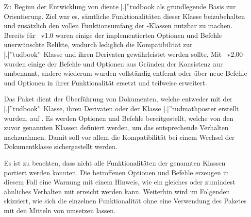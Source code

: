 \begin{DeclareEntity}{}
\begin{NoIndexDefault}
Zu Beginn der Entwicklung von \TUDScript diente \Class|.|''{tudbook} als 
grundlegende Basis zur Orientierung. Ziel war es, sämtliche Funktionalitäten 
dieser Klasse beizubehalten und zusätzlich den vollen Funktionsumfang der 
\KOMAScript-Klassen nutzbar zu machen. Bereits für \TUDScript~v1.0 waren einige 
der implementierten Optionen und Befehle unerwünschte Relikte, wodurch 
lediglich die Kompatibilität zur \Class|.|''{tudbook}"~Klasse und ihren 
Derivaten gewährleistet werden sollte. Mit \TUDScript~v2.00 wurden einige der 
Befehle und Optionen aus Gründen der Konsistenz nur umbenannt, andere wiederum 
wurden vollständig entfernt oder über neue Befehle und Optionen in ihrer 
Funktionalität ersetzt und teilweise erweitert. 

Das Paket  dient der Überführung von Dokumenten, welche
entweder mit der \Class|.|''{tudbook}"~Klasse, ihren Derivaten oder der Klasse 
\Class|.|''{tudmathposter} erstellt wurden, auf \vTUDScript*{\TUDScript}. Es 
werden Optionen und Befehle bereitgestellt, welche von den zuvor genannten 
Klassen definiert werden, um das entsprechende Verhalten nachzuahmen. Damit 
soll vor allem die Kompatibilität bei einem Wechsel der Dokumentklasse 
sichergestellt werden.
%
\begin{quoting}
\end{quoting}
%
Es ist zu beachten, dass nicht alle Funktionalitäten der genannten Klassen 
portiert werden konnten. Die betroffenen Optionen und Befehle erzeugen in 
diesem Fall eine Warnung mit einem Hinweis, wie ein gleiches oder zumindest 
ähnliches Verhalten mit \TUDScript erreicht werden kann. Weiterhin wird im 
Folgenden skizziert, wie sich die einzelnen Funktionalität ohne eine Verwendung 
des Paketes  mit den Mitteln von \TUDScript umsetzen 
lassen. 


\end{NoIndexDefault}
\end{DeclareEntity}
